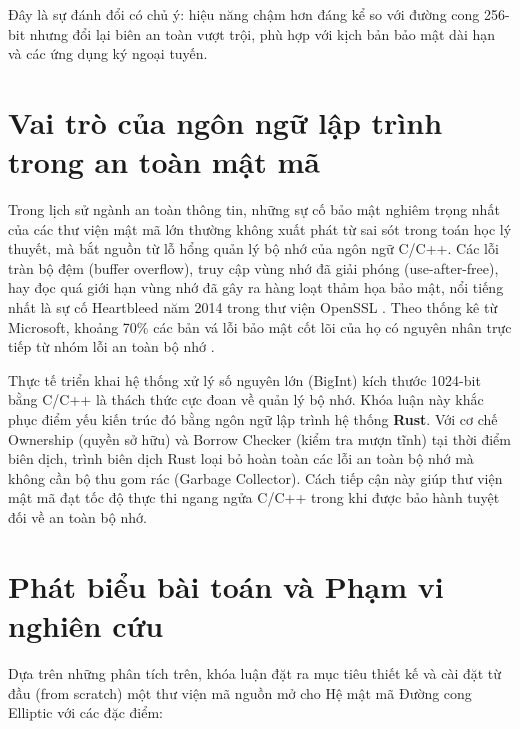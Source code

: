 Đây là sự đánh đổi có chủ ý: hiệu năng chậm hơn đáng kể so với đường
cong 256-bit nhưng đổi lại biên an toàn vượt trội, phù hợp với kịch bản
bảo mật dài hạn và các ứng dụng ký ngoại tuyến.

\section{Vai trò của ngôn ngữ lập trình trong an toàn mật
mã}\label{vai-truxf2-cux1ee7a-nguxf4n-ngux1eef-lux1eadp-truxecnh-trong-an-touxe0n-mux1eadt-muxe3}

Trong lịch sử ngành an toàn thông tin, những sự cố bảo mật nghiêm trọng
nhất của các thư viện mật mã lớn thường không xuất phát từ sai sót trong
toán học lý thuyết, mà bắt nguồn từ lỗ hổng quản lý bộ nhớ của ngôn ngữ
C/C++. Các lỗi tràn bộ đệm (buffer overflow), truy cập vùng nhớ đã giải
phóng (use-after-free), hay đọc quá giới hạn vùng nhớ đã gây ra hàng
loạt thảm họa bảo mật, nổi tiếng nhất là sự cố Heartbleed năm 2014 trong
thư viện OpenSSL \citep{CVE_Heartbleed}. Theo thống kê từ Microsoft,
khoảng 70\% các bản vá lỗi bảo mật cốt lõi của họ có nguyên nhân trực
tiếp từ nhóm lỗi an toàn bộ nhớ \citep{MicrosoftMemorySafety}.

Thực tế triển khai hệ thống xử lý số nguyên lớn (BigInt) kích thước
1024-bit bằng C/C++ là thách thức cực đoan về quản lý bộ nhớ. Khóa luận
này khắc phục điểm yếu kiến trúc đó bằng ngôn ngữ lập trình hệ thống
\textbf{Rust}. Với cơ chế Ownership (quyền sở hữu) và Borrow Checker
(kiểm tra mượn tĩnh) tại thời điểm biên dịch, trình biên dịch Rust loại
bỏ hoàn toàn các lỗi an toàn bộ nhớ mà không cần bộ thu gom rác (Garbage
Collector). Cách tiếp cận này giúp thư viện mật mã đạt tốc độ thực thi
ngang ngửa C/C++ trong khi được bảo hành tuyệt đối về an toàn bộ nhớ.

\section{Phát biểu bài toán và Phạm vi nghiên
cứu}\label{phuxe1t-biux1ec3u-buxe0i-touxe1n-vuxe0-phux1ea1m-vi-nghiuxean-cux1ee9u}

Dựa trên những phân tích trên, khóa luận đặt ra mục tiêu thiết kế và cài
đặt từ đầu (from scratch) một thư viện mã nguồn mở cho Hệ mật mã Đường
cong Elliptic với các đặc điểm:

